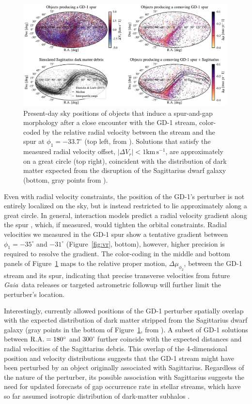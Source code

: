 \documentclass[twocolumn]{aastex63}
\newcommand{\gaia}{\textsl{Gaia}}
\newcommand{\kms}{\ensuremath{\textrm{km}\,\textrm{s}^{-1}}}
\begin{document}
\begin{figure}
\begin{center}
\includegraphics[width=0.99\textwidth]{skybox.pdf}
\end{center}
\caption{Present-day sky positions of objects that induce a spur-and-gap morphology after a close encounter with the GD-1 stream, color-coded by the relative radial velocity between the stream and the spur at $\phi_1=-33.7^\circ$ (top left, from \citealt{bonaca2019a}).
Solutions that satisfy the measured radial velocity offset, $|\Delta V_r|<1\kms$, are approximately on a great circle (top right), coincident with the distribution of dark matter expected from the disruption of the Sagittarius dwarf galaxy (bottom, gray points from \citealt{dl2017}).
}
\label{fig:skybox}
\end{figure}

Even with radial velocity constraints, the position of the GD-1's perturber is not entirely localized on the sky, but is instead restricted to lie approximately along a great circle.
In general, interaction models predict a radial velocity gradient along the spur \citep{bonaca2019a}, which, if measured, would tighten the orbital constraints.
Radial velocities we measured in the GD-1 spur show a tentative gradient between $\phi_1=-35^\circ$ and $-31^\circ$ (Figure~\ref{fig:vr}, bottom), however, higher precision is required to resolve the gradient.
The color-coding in the middle and bottom panels of Figure~\ref{fig:skybox} maps to the relative proper motion, $\Delta\mu_{\phi_2}$, between the GD-1 stream and its spur, indicating that precise transverse velocities from future \gaia\ data releases or targeted astrometric followup will further limit the perturber's location.

Interestingly, currently allowed positions of the GD-1 perturber spatially overlap with the expected distribution of dark matter stripped from the Sagittarius dwarf galaxy (gray points in the bottom of Figure~\ref{fig:skybox}, from \citealt{dl2017}).
A subset of GD-1 solutions between $\rm R.A.=180^\circ$ and $300^\circ$ further coincide with the expected distances and radial velocities of the Sagittarius debris.
This overlap of the 4-dimensional position and velocity distributions suggests that the GD-1 stream might have been perturbed by an object originally associated with Sagittarius.
Regardless of the nature of the perturber, its possible association with Sagittarius suggests the need for updated forecasts of gap occurrence rate in stellar streams, which have so far assumed isotropic distribution of dark-matter subhalos \citep[e.g.,][]{erkal2016, banik2019}.
\end{document}
